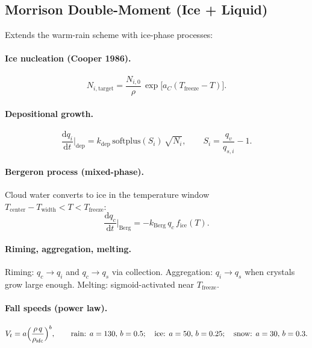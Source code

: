 \documentclass[11pt,twoside]{report}
\newcommand{\dd}{\mathrm{d}}
\begin{document}
\subsection{Morrison Double-Moment (Ice + Liquid)}

Extends the warm-rain scheme with ice-phase processes:

\paragraph{Ice nucleation (Cooper 1986).}
\begin{equation}
  N_{i,\mathrm{target}} = \frac{N_{i,0}}{\rho}\,
  \exp\!\bigl[a_C(T_{\mathrm{freeze}}-T)\bigr].
\end{equation}

\paragraph{Depositional growth.}
\begin{equation}
  \frac{\dd q_i}{\dd t}\bigg|_{\mathrm{dep}}
  = k_{\mathrm{dep}}\,\mathrm{softplus}(S_i)\,\sqrt{N_i},
  \qquad S_i = \frac{q_v}{q_{s,i}}-1.
\end{equation}

\paragraph{Bergeron process (mixed-phase).}
Cloud water converts to ice in the temperature window
$T_{\mathrm{center}}-T_{\mathrm{width}} < T < T_{\mathrm{freeze}}$:
\begin{equation}
  \frac{\dd q_c}{\dd t}\bigg|_{\mathrm{Berg}}
  = -k_{\mathrm{Berg}}\,q_c\,f_{\mathrm{ice}}(T).
\end{equation}

\paragraph{Riming, aggregation, melting.}
Riming: $q_{c}\to q_i$ and $q_c\to q_s$ via collection.
Aggregation: $q_i\to q_s$ when crystals grow large enough.
Melting: sigmoid-activated near $T_{\mathrm{freeze}}$.

\paragraph{Fall speeds (power law).}
\begin{equation}
  V_t = a\Bigl(\frac{\rho\,q}{\rho_{\mathrm{sfc}}}\Bigr)^b,
  \qquad \text{rain: } a=130,\,b=0.5;\quad
  \text{ice: } a=50,\,b=0.25;\quad
  \text{snow: } a=30,\,b=0.3.
\end{equation}
\end{document}
